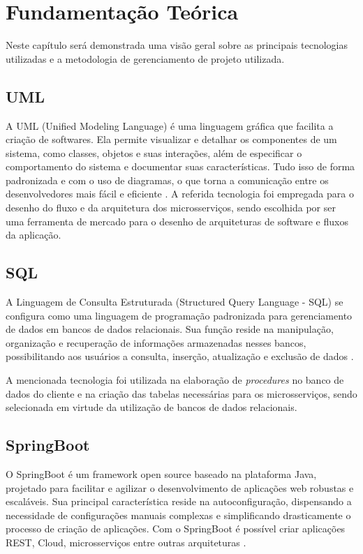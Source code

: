 \chapter{Fundamentação Teórica}
\label{cap:fundamentacao}
Neste capítulo será demonstrada uma visão geral sobre as principais tecnologias
utilizadas e a metodologia de gerenciamento de projeto utilizada.


\section{UML}
A UML (Unified Modeling Language) é uma linguagem gráfica que facilita a criação de softwares. Ela permite visualizar e 
detalhar os componentes de um sistema, como classes, objetos e suas interações, além de especificar o comportamento do 
sistema e documentar suas características. Tudo isso de forma padronizada e com o uso de diagramas, o que torna a 
comunicação entre os desenvolvedores mais fácil e eficiente \cite{uml:explicacao}. 
A referida tecnologia foi empregada para o desenho do fluxo e da arquitetura dos microsserviços, sendo escolhida por ser 
uma ferramenta de mercado para o desenho de arquiteturas de software e fluxos da aplicação.


\section{SQL}
A Linguagem de Consulta Estruturada (Structured Query Language - SQL) se configura como uma linguagem de programação 
padronizada para gerenciamento de dados em bancos de dados relacionais. Sua função reside na manipulação, 
organização e recuperação de informações armazenadas nesses bancos, possibilitando aos usuários a consulta, inserção,
atualização e exclusão de dados \cite{sql:explicacao}.

A mencionada tecnologia foi utilizada na elaboração de \textit{procedures} no banco de dados do cliente e na criação das 
tabelas necessárias para os microsserviços, sendo selecionada em virtude da utilização de bancos de dados relacionais.


\section{SpringBoot}
O SpringBoot é um framework open source baseado na plataforma Java, projetado para facilitar e 
agilizar o desenvolvimento de aplicações web robustas e escaláveis. Sua principal característica reside na 
autoconfiguração, dispensando a necessidade de configurações manuais complexas e simplificando drasticamente o processo 
de criação de aplicações. Com o SpringBoot é possível criar aplicações REST, Cloud, microsserviços entre outras 
arquiteturas \cite{spring:explicacao}.

